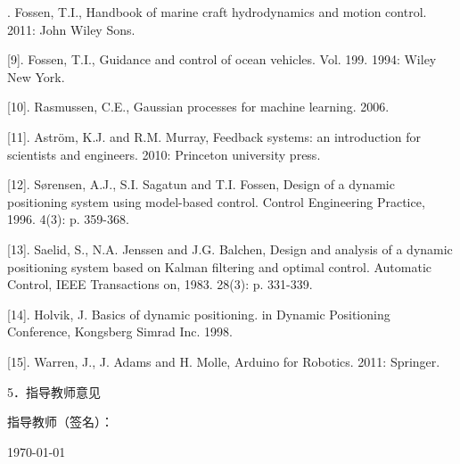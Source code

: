 \documentclass[a4paper,fontset=fandol]{ctexart}
\begin{document}
 \begin{mdframed}
 {\large \fangsong
 [8].	Fossen, T.I., Handbook of marine craft hydrodynamics and motion control. 2011: John Wiley  Sons.
 
 [9].	Fossen, T.I., Guidance and control of ocean vehicles. Vol. 199. 1994: Wiley New York.
 
[10].	Rasmussen, C.E., Gaussian processes for machine learning. 2006.

[11].	Aström, K.J. and R.M. Murray, Feedback systems: an introduction for scientists and engineers. 2010: Princeton university press.

[12].	Sørensen, A.J., S.I. Sagatun and T.I. Fossen, Design of a dynamic positioning system using model-based control. Control Engineering Practice, 1996. 4(3): p. 359-368.

[13].	Saelid, S., N.A. Jenssen and J.G. Balchen, Design and analysis of a dynamic positioning system based on Kalman filtering and optimal control. Automatic Control, IEEE Transactions on, 1983. 28(3): p. 331-339.

[14].	Holvik, J. Basics of dynamic positioning. in Dynamic Positioning Conference, Kongsberg Simrad Inc. 1998.

[15].	Warren, J., J. Adams and H. Molle, Arduino for Robotics. 2011: Springer.

\begin{flushleft}
5．指导教师意见

\end{flushleft}
\vskip7.8cm
\begin{flushright}
指导教师（签名）：\quad \quad \quad 

\today
\end{flushright}                  
}
\end{mdframed}

\end{document}

